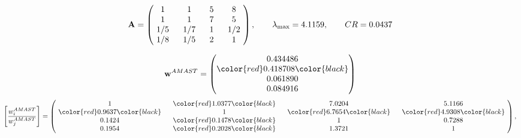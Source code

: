 \begin{example}
\begin{equation*}
\mathbf{A} =
\begin{pmatrix}
$\,\,$ 1 $\,\,$ & $\,\,$1$\,\,$ & $\,\,$5$\,\,$ & $\,\,$8 $\,\,$ \\
$\,\,$ 1 $\,\,$ & $\,\,$ 1 $\,\,$ & $\,\,$7$\,\,$ & $\,\,$5 $\,\,$ \\
$\,\,$ 1/5$\,\,$ & $\,\,$ 1/7$\,\,$ & $\,\,$ 1 $\,\,$ & $\,\,$ 1/2 $\,\,$ \\
$\,\,$ 1/8$\,\,$ & $\,\,$ 1/5$\,\,$ & $\,\,$2$\,\,$ & $\,\,$ 1  $\,\,$ \\
\end{pmatrix},
\qquad
\lambda_{\max} =
4.1159,
\qquad
CR = 0.0437
\end{equation*}

\begin{equation*}
\mathbf{w}^{AMAST} =
\begin{pmatrix}
0.434486\\
\color{red} 0.418708\color{black} \\
0.061890\\
0.084916
\end{pmatrix}\end{equation*}
\begin{equation*}
\left[ \frac{{w}^{AMAST}_i}{{w}^{AMAST}_j} \right] =
\begin{pmatrix}
$\,\,$ 1 $\,\,$ & $\,\,$\color{red} 1.0377\color{black} $\,\,$ & $\,\,$7.0204$\,\,$ & $\,\,$5.1166$\,\,$ \\
$\,\,$\color{red} 0.9637\color{black} $\,\,$ & $\,\,$ 1 $\,\,$ & $\,\,$\color{red} 6.7654\color{black} $\,\,$ & $\,\,$\color{red} 4.9308\color{black}   $\,\,$ \\
$\,\,$0.1424$\,\,$ & $\,\,$\color{red} 0.1478\color{black} $\,\,$ & $\,\,$ 1 $\,\,$ & $\,\,$0.7288 $\,\,$ \\
$\,\,$0.1954$\,\,$ & $\,\,$\color{red} 0.2028\color{black} $\,\,$ & $\,\,$1.3721$\,\,$ & $\,\,$ 1  $\,\,$ \\
\end{pmatrix},
\end{equation*}


\end{example}
